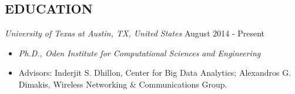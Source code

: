 \documentclass[margin, 10pt]{res} %
\begin{document}
\begin{resume}

 






\section{EDUCATION}

{\sl University of Texas at Austin, TX, United States} \hfill August 2014 - Present
\begin{itemize}
\item {\sl Ph.D., Oden Institute for Computational Sciences and Engineering} 
\item Advisors: Inderjit S. Dhillon, Center for Big Data Analytics; Alexandros 
  G. Dimakis, Wireless Networking \& Communications Group.  
\end{itemize} 



\end{resume}
\end{document}
